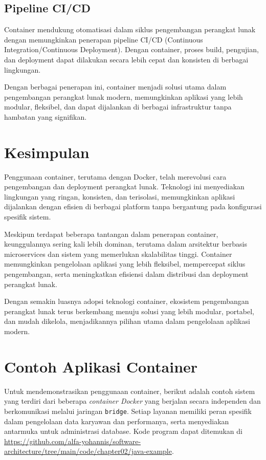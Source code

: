 \subsection{Pipeline CI/CD}
Container mendukung otomatisasi dalam siklus pengembangan perangkat lunak dengan memungkinkan penerapan pipeline CI/CD (Continuous Integration/Continuous Deployment). Dengan container, proses build, pengujian, dan deployment dapat dilakukan secara lebih cepat dan konsisten di berbagai lingkungan.

Dengan berbagai penerapan ini, container menjadi solusi utama dalam pengembangan perangkat lunak modern, memungkinkan aplikasi yang lebih modular, fleksibel, dan dapat dijalankan di berbagai infrastruktur tanpa hambatan yang signifikan.


\section{Kesimpulan}

Penggunaan container, terutama dengan Docker, telah merevolusi cara pengembangan dan deployment perangkat lunak. Teknologi ini menyediakan lingkungan yang ringan, konsisten, dan terisolasi, memungkinkan aplikasi dijalankan dengan efisien di berbagai platform tanpa bergantung pada konfigurasi spesifik sistem.

Meskipun terdapat beberapa tantangan dalam penerapan container, keunggulannya sering kali lebih dominan, terutama dalam arsitektur berbasis microservices dan sistem yang memerlukan skalabilitas tinggi. Container memungkinkan pengelolaan aplikasi yang lebih fleksibel, mempercepat siklus pengembangan, serta meningkatkan efisiensi dalam distribusi dan deployment perangkat lunak.

Dengan semakin luasnya adopsi teknologi container, ekosistem pengembangan perangkat lunak terus berkembang menuju solusi yang lebih modular, portabel, dan mudah dikelola, menjadikannya pilihan utama dalam pengelolaan aplikasi modern.



\section{Contoh Aplikasi Container}

Untuk mendemonstrasikan penggunaan container, berikut adalah contoh sistem yang terdiri dari beberapa \textit{container Docker} yang berjalan secara independen dan berkomunikasi melalui jaringan \texttt{bridge}. Setiap layanan memiliki peran spesifik dalam pengelolaan data karyawan dan performanya, serta menyediakan antarmuka untuk administrasi database. Kode program dapat ditemukan di \url{https://github.com/alfa-yohannis/software-architecture/tree/main/code/chapter02/java-example}.

